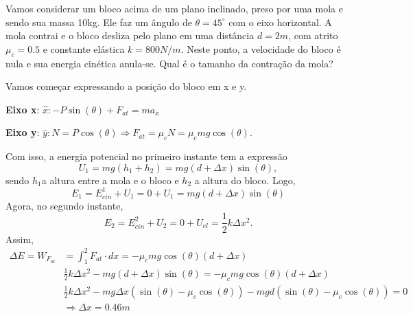 \documentclass[PhysicsI/physics_notes.tex]{subfiles}
\begin{document}
\begin{example}
	Vamos considerar um bloco acima de um plano inclinado, preso por uma mola e sendo sua massa 10kg.
	Ele faz um ângulo de \(\theta =45^{\circ}\) com o eixo horizontal. A mola contrai e o bloco desliza pelo plano em uma distância \(d=2m\),
	com atrito \(\mu_{c}=0.5\) e constante elástica \(k=800N/m\). Neste ponto, a velocidade do bloco é nula e
	sua energia cinética anula-se. Qual é o tamanho da contração da mola?

	Vamos começar expressando a posição do bloco em x e y.

	\textbf{Eixo x}: \(\hat{x}: -P\sin{(\theta )} + F_{at} = ma_{x}\)

	\textbf{Eixo y}: \(\hat{y}: N = P\cos{(\theta )} \Rightarrow F_{at}=\mu_{c}N = \mu_{c}mg\cos{(\theta )}.\)

	Com isso, a energia potencial no primeiro instante tem a expressão
	\[
		U_{1} = mg(h_{1}+h_{2}) = mg(d+\Delta x)\sin{(\theta )},
	\]
	sendo \(h_{1}\)a altura entre a mola e o bloco e \(h_{2}\) a altura do bloco. Logo,
	\[
		E_{1} = E_{cin}^{1} + U_{1} = 0 + U_{1} = mg(d + \Delta x)\sin(\theta )
	\]
	Agora, no segundo instante,
	\[
		E_{2} = E_{cin}^{2} + U_{2} = 0 + U_{el} = \frac{1}{2}k\Delta x^{2}.
	\]
	Assim,
	\begin{align*}
		\Delta E = W_{F_{at}} & = \int_{1}^{2} F_{at}\cdot dx = -\mu_{c}mg\cos{(\theta )}(d+\Delta x)                                                       \\
		                      & \frac{1}{2}k\Delta x^{2} - mg(d+\Delta x)\sin{(\theta )} = -\mu_{c}mg\cos{(\theta )}(d+\Delta x)                            \\
		                      & \frac{1}{2}k\Delta x^{2} - mg\Delta x(\sin{(\theta )}-\mu_c\cos{(\theta )}) - mgd(\sin{(\theta )}-\mu_{c}\cos{(\theta )})=0 \\
		                      & \Rightarrow \Delta x=0.46m
	\end{align*}
\end{example}
\newpage
\end{document}
